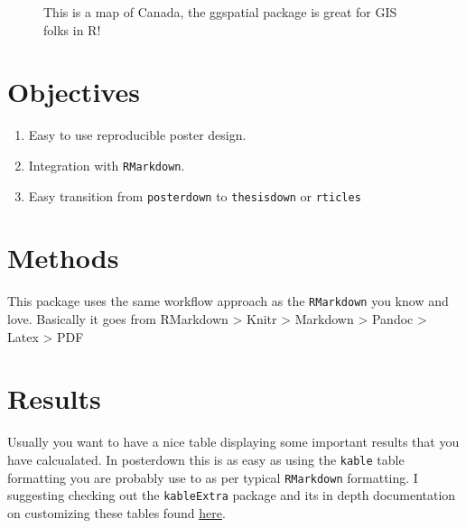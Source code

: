\documentclass[article,30pt,extrafontsizes]{memoir}
\begin{document}
\begin{adjmulticols*}{4}{10mm}{10mm}
{\begin{figure}
{}

\caption{This is a map of Canada, the ggspatial package is great for GIS folks in R!}\label{fig:unnamed-chunk-2}
\end{figure}

\section{Objectives}\label{objectives}

\large

\begin{enumerate}
\def\labelenumi{\arabic{enumi}.}
\tightlist
\item
  Easy to use reproducible poster design.
\item
  Integration with \texttt{RMarkdown}.
\item
  Easy transition from \texttt{posterdown} to \texttt{thesisdown} or
  \texttt{rticles}
\end{enumerate}

\small

\section{Methods}\label{methods}

This package uses the same workflow approach as the \texttt{RMarkdown}
you know and love. Basically it goes from RMarkdown \textgreater{} Knitr
\textgreater{} Markdown \textgreater{} Pandoc \textgreater{} Latex
\textgreater{} PDF

\lipsum[1-3]

\section{Results}\label{results}

Usually you want to have a nice table displaying some important results
that you have calcualated. In posterdown this is as easy as using the
\texttt{kable} table formatting you are probably use to as per typical
\texttt{RMarkdown} formatting. I suggesting checking out the
\texttt{kableExtra} package and its in depth documentation on
customizing these tables found
\href{https://haozhu233.github.io/kableExtra/awesome_table_in_pdf.pdf}{here}.

\vspace{1in}

\begin{table}[H]


\end{table}}
\end{adjmulticols*}
\end{document}
